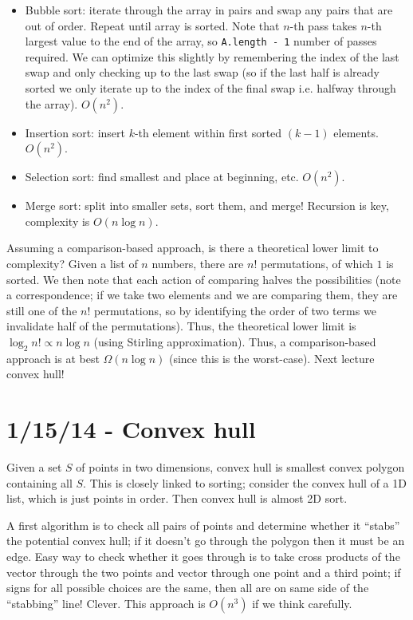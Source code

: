 \documentclass[10pt, twocolumn]{article}
\begin{document}
\begin{itemize}
    \item Bubble sort: iterate through the array in pairs and swap any pairs that are out of order. Repeat until array is sorted. Note that $n$-th pass takes $n$-th largest value to the end of the array, so \texttt{A.length - 1} number of passes required. We can optimize this slightly by remembering the index of the last swap and only checking up to the last swap (so if the last half is already sorted we only iterate up to the index of the final swap i.e. halfway through the array). $O(n^2)$.
    \item Insertion sort: insert $k$-th element within first sorted $(k-1)$ elements. $O(n^2)$.
    \item Selection sort: find smallest and place at beginning, etc. $O(n^2)$. 
    \item Merge sort: split into smaller sets, sort them, and merge! Recursion is key, complexity is $O(n\log n)$. 
\end{itemize}

Assuming a comparison-based approach, is there a theoretical lower limit to complexity? Given a list of $n$ numbers, there are $n!$ permutations, of which $1$ is sorted. We then note that each action of comparing halves the possibilities (note a correspondence; if we take two elements and we are comparing them, they are still one of the $n!$ permutations, so by identifying the order of two terms we invalidate half of the permutations). Thus, the theoretical lower limit is $\log_2 n! \propto n\log n$ (using Stirling approximation). Thus, a comparison-based approach is at best $\Omega(n\log n)$ (since this is the worst-case). Next lecture convex hull!

\section{1/15/14 - Convex hull}

Given a set $S$ of points in two dimensions, convex hull is smallest convex polygon containing all $S$. This is closely linked to sorting; consider the convex hull of a 1D list, which is just points in order. Then convex hull is almost 2D sort. 

A first algorithm is to check all pairs of points and determine whether it ``stabs'' the potential convex hull; if it doesn't go through the polygon then it must be an edge. Easy way to check whether it goes through is to take cross products of the vector through the two points and vector through one point and a third point; if signs for all possible choices are the same, then all are on same side of the ``stabbing'' line! Clever. This approach is $O(n^3)$ if we think carefully.
\end{document}
